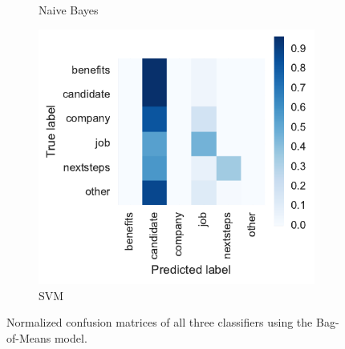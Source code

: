\begin{figure}[h]
\begin{subfigure}[b]{0.32\textwidth}
        \caption{Naive Bayes}
\label{fig:exp-vector-space-conf-matrix-bom-naivebayes-normalized}
    \end{subfigure}
    \begin{subfigure}[b]{0.32\textwidth}
        \includegraphics[width=\textwidth]{img/exp-vector-space-conf-matrix-bom-svm-normalized.pdf}
        \caption{SVM}
\label{fig:exp-vector-space-conf-matrix-bom-svm-normalized}
    \end{subfigure}
    \caption{Normalized confusion matrices of all three classifiers using the Bag-of-Means model.}
\label{fig:exp-vector-space-conf-matrix-bom}
\end{figure}

